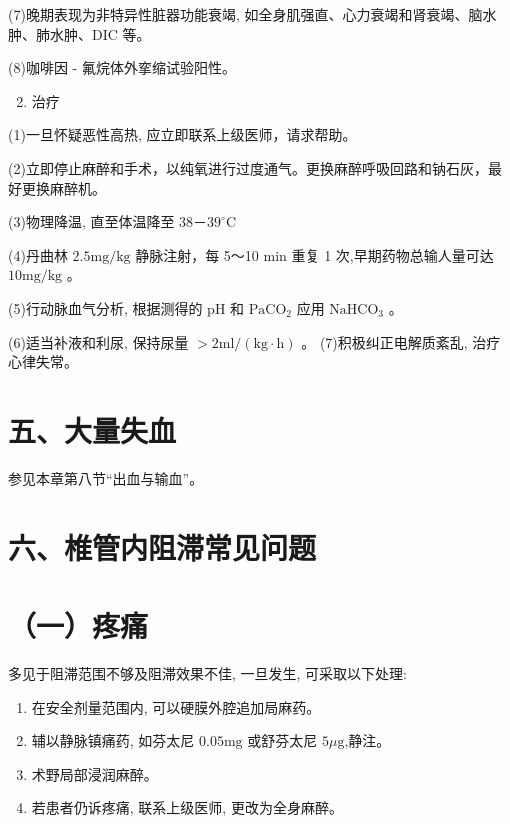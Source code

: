 \documentclass[10pt]{article}
\begin{document}
(7)晚期表现为非特异性脏器功能衰竭, 如全身肌强直、心力衰竭和肾衰竭、脑水肿、肺水肿、DIC 等。

(8)咖啡因 - 氟烷体外挛缩试验阳性。

\begin{enumerate}
  \setcounter{enumi}{1}
  \item 治疗
\end{enumerate}

(1)一旦怀疑恶性高热, 应立即联系上级医师，请求帮助。

(2)立即停止麻醉和手术，以纯氧进行过度通气。更换麻醉呼吸回路和钠石灰，最好更换麻醉机。

(3)物理降温, 直至体温降至 $38 － 39^{\circ} \mathrm{C}$

(4)丹曲林 $2.5 \mathrm{mg} / \mathrm{kg}$ 静脉注射，每 5～10 min 重复 1 次,早期药物总输人量可达 $10 \mathrm{mg} / \mathrm{kg}$ 。

(5)行动脉血气分析, 根据测得的 $\mathrm{pH}$ 和 $\mathrm{PaCO}_{2}$ 应用 $\mathrm{NaHCO}_{3}$ 。

(6)适当补液和利尿, 保持尿量 $>2 \mathrm{ml} /(\mathrm{kg} \cdot \mathrm{h})$ 。 (7)积极纠正电解质紊乱, 治疗心律失常。

\section*{五、大量失血}
参见本章第八节“出血与输血”。

\section*{六、椎管内阻滞常见问题}
\section*{（一）疼痛}
多见于阻滞范围不够及阻滞效果不佳, 一旦发生, 可采取以下处理:

\begin{enumerate}
  \item 在安全剂量范围内, 可以硬膜外腔追加局麻药。

  \item 辅以静脉镇痛药, 如芬太尼 $0.05 \mathrm{mg}$ 或舒芬太尼 $5 \mu \mathrm{g}$,静注。

  \item 术野局部浸润麻醉。

  \item 若患者仍诉疼痛, 联系上级医师, 更改为全身麻醉。

\end{enumerate}
\end{document}
